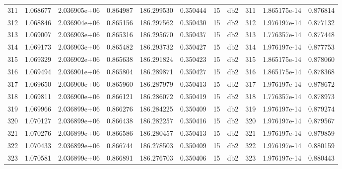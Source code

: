 \begin{tabular}{lrrrrrrlrrr}
311  &    1.068677 &        2.036905e+06 &  0.864987 &              186.299530 &    0.350444 &      15 &          db2 &    311 &   1.865175e-14 &      0.876814 \\
312  &    1.068846 &        2.036904e+06 &  0.865156 &              186.297562 &    0.350430 &      15 &          db2 &    312 &   1.976197e-14 &      0.877132 \\
313  &    1.069007 &        2.036903e+06 &  0.865316 &              186.295670 &    0.350437 &      15 &          db2 &    313 &   1.776357e-14 &      0.877448 \\
314  &    1.069173 &        2.036903e+06 &  0.865482 &              186.293732 &    0.350427 &      15 &          db2 &    314 &   1.976197e-14 &      0.877753 \\
315  &    1.069329 &        2.036902e+06 &  0.865638 &              186.291824 &    0.350423 &      15 &          db2 &    315 &   1.865175e-14 &      0.878060 \\
316  &    1.069494 &        2.036901e+06 &  0.865804 &              186.289871 &    0.350427 &      15 &          db2 &    316 &   1.865175e-14 &      0.878368 \\
317  &    1.069650 &        2.036900e+06 &  0.865960 &              186.287979 &    0.350413 &      15 &          db2 &    317 &   1.976197e-14 &      0.878672 \\
318  &    1.069811 &        2.036900e+06 &  0.866121 &              186.286072 &    0.350419 &      15 &          db2 &    318 &   1.776357e-14 &      0.878973 \\
319  &    1.069966 &        2.036899e+06 &  0.866276 &              186.284225 &    0.350409 &      15 &          db2 &    319 &   1.976197e-14 &      0.879274 \\
320  &    1.070127 &        2.036899e+06 &  0.866438 &              186.282257 &    0.350416 &      15 &          db2 &    320 &   1.976197e-14 &      0.879567 \\
321  &    1.070276 &        2.036899e+06 &  0.866586 &              186.280457 &    0.350413 &      15 &          db2 &    321 &   1.976197e-14 &      0.879859 \\
322  &    1.070433 &        2.036899e+06 &  0.866744 &              186.278503 &    0.350409 &      15 &          db2 &    322 &   1.976197e-14 &      0.880159 \\
323  &    1.070581 &        2.036899e+06 &  0.866891 &              186.276703 &    0.350406 &      15 &          db2 &    323 &   1.976197e-14 &      0.880443 \\

\end{tabular}
